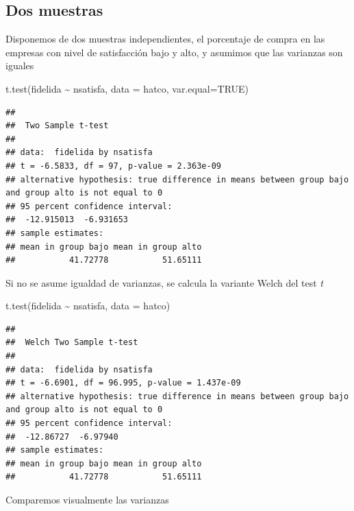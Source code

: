 \documentclass[
]{book}
\newenvironment{Shaded}{\begin{snugshade}}{\end{snugshade}}
\newcommand{\AttributeTok}[1]{\textcolor[rgb]{0.77,0.63,0.00}{#1}}
\newcommand{\ConstantTok}[1]{\textcolor[rgb]{0.00,0.00,0.00}{#1}}
\newcommand{\FunctionTok}[1]{\textcolor[rgb]{0.00,0.00,0.00}{#1}}
\newcommand{\NormalTok}[1]{#1}
\newcommand{\SpecialCharTok}[1]{\textcolor[rgb]{0.00,0.00,0.00}{#1}}
\theoremstyle{break}
\theoremstyle{nonumberplain}
\begin{document}
\hypertarget{dos-muestras}{%
\subsection{Dos muestras}\label{dos-muestras}}

Disponemos de dos muestras independientes, el porcentaje de compra
en las empresas con nivel de satisfacción bajo y alto,
y asumimos que las varianzas son iguales

\begin{Shaded}
\begin{Highlighting}[]
\FunctionTok{t.test}\NormalTok{(fidelida }\SpecialCharTok{\textasciitilde{}}\NormalTok{ nsatisfa, }\AttributeTok{data =}\NormalTok{ hatco, }\AttributeTok{var.equal=}\ConstantTok{TRUE}\NormalTok{)}
\end{Highlighting}
\end{Shaded}

\begin{verbatim}
## 
##  Two Sample t-test
## 
## data:  fidelida by nsatisfa
## t = -6.5833, df = 97, p-value = 2.363e-09
## alternative hypothesis: true difference in means between group bajo and group alto is not equal to 0
## 95 percent confidence interval:
##  -12.915013  -6.931653
## sample estimates:
## mean in group bajo mean in group alto 
##           41.72778           51.65111
\end{verbatim}

Si no se asume igualdad de varianzas, se calcula la variante Welch del test \emph{t}

\begin{Shaded}
\begin{Highlighting}[]
\FunctionTok{t.test}\NormalTok{(fidelida }\SpecialCharTok{\textasciitilde{}}\NormalTok{ nsatisfa, }\AttributeTok{data =}\NormalTok{ hatco)}
\end{Highlighting}
\end{Shaded}

\begin{verbatim}
## 
##  Welch Two Sample t-test
## 
## data:  fidelida by nsatisfa
## t = -6.6901, df = 96.995, p-value = 1.437e-09
## alternative hypothesis: true difference in means between group bajo and group alto is not equal to 0
## 95 percent confidence interval:
##  -12.86727  -6.97940
## sample estimates:
## mean in group bajo mean in group alto 
##           41.72778           51.65111
\end{verbatim}

Comparemos visualmente las varianzas
\end{document}
